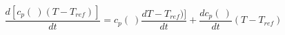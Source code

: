 \begin{equation}
\frac{d [c_p(\ ) (T-T_{ref})]}{dt} =c_p(\ ) \frac{d T- T_{ref})]}{dt} + \frac{d c_p(\ )}{dt} (T- T_{ref})
\end{equation}